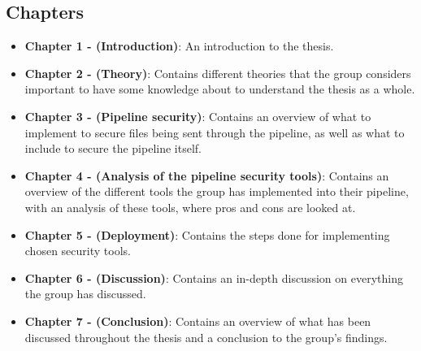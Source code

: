 \subsection{Chapters}
\begin{itemize}
    \item \textbf{Chapter 1 - (Introduction)}: An introduction to the thesis.
    \item \textbf{Chapter 2 - (Theory)}: Contains different theories that the group considers important 
    to have some knowledge about to understand the thesis as a whole.
    \item \textbf{Chapter 3 - (Pipeline security)}: Contains an overview of what to implement to secure files being sent through the pipeline, as well as what to include to secure the pipeline itself. 
    \item \textbf{Chapter 4 - (Analysis of the pipeline security tools)}: Contains an overview of the different tools the group has implemented into their pipeline, with an analysis of these tools, where pros and cons are looked at. 
    \item \textbf{Chapter 5 - (Deployment)}: Contains the steps done for implementing chosen security tools. 
    \item \textbf{Chapter 6 - (Discussion)}: Contains an in-depth discussion on everything the group has discussed. 
    \item \textbf{Chapter 7 - (Conclusion)}: Contains an overview of what has been discussed throughout the thesis and a conclusion to the group's findings. 

\end{itemize}






